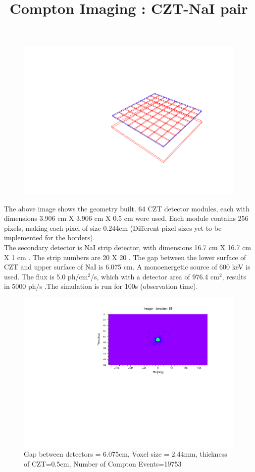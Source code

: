 \documentclass[10pt,a4paper]{article}
\title{Compton Imaging : CZT-NaI pair}
\begin{document}
\maketitle
\begin{figure}[H]
\centering
\includegraphics[scale=.75, angle=270, origin=c]{czt_nai_modular}
\end{figure}
The above image shows the geometry built. 64 CZT detector modules, each with dimensions 3.906 cm X 3.906 cm X 0.5 cm were used. Each module contains 256 pixels, making each pixel of size 0.244cm (Different pixel sizes yet to be implemented for the borders). \\
The secondary detector is NaI strip detector, with dimensions 16.7 cm X 16.7 cm X 1 cm . The strip numbers are 20 X 20 .
The gap between the lower surface of CZT and upper surface of NaI is 6.075 cm. 
A monoenergetic source of 600 keV is used. The flux is 5.0 ph/cm$^2$/s, which with a detector area of 976.4 cm$^2$, results in 5000 ph/s .The simulation is run for 100s (observation time). \\
\newpage
\begin{figure}[H]
\centering
\includegraphics[trim={0 5cm 0 5cm}, scale=.75, angle=270, origin=c]{czt_original}
\caption{Gap between detectors = 6.075cm, Voxel size = 2.44mm, thickness of CZT=0.5cm, Number of Compton Events=19753}
\end{figure}
\end{document}
